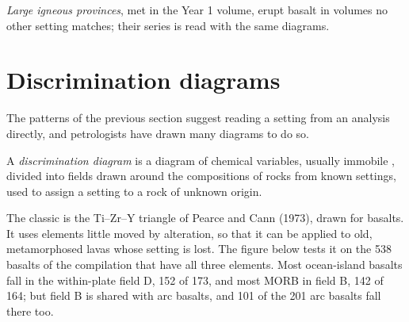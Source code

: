\emph{Large igneous provinces}, met in the Year 1 volume, erupt basalt in volumes
no other setting matches; their series is read with the same diagrams.

\section{Discrimination diagrams}\label{sec:b2:magmatic-series:discrimination}

The patterns of the previous section suggest reading a setting from an analysis
directly, and petrologists have drawn many diagrams to do so.

\begin{definition}\label{def:b2:magmatic-series:discrimination}
A \emph{discrimination diagram} is a diagram of
chemical variables, usually immobile , divided into fields drawn
around the compositions of rocks from known settings, used to assign a setting to a
rock of unknown origin.
\end{definition}

The classic is the Ti--Zr--Y triangle of Pearce and Cann (1973), drawn for basalts. It
uses elements little moved by alteration, so that it can be applied to old,
metamorphosed lavas whose setting is lost. The figure below tests it on the 538 basalts of the
compilation that have all three elements. Most ocean-island basalts fall in the
within-plate field D, 152 of 173, and most MORB in field B, 142 of 164; but field B is
shared with arc basalts, and 101 of the 201 arc basalts fall there too.

